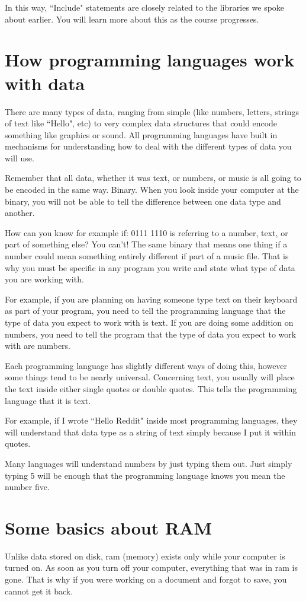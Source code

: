 \documentclass[a4paper,12pt]{article}
\let\stdsection\section
\renewcommand\section{\newpage\stdsection}
\begin{document}
In this way, ``Include" statements are closely related to the libraries we spoke about earlier. You will learn more about this as the course progresses.
\section{How programming languages work with data}
There are many types of data, ranging from simple (like numbers, letters, strings of text like ``Hello", etc) to very complex data structures that could encode something like graphics or sound. All programming languages have built in mechanisms for understanding how to deal with the different types of data you will use.

Remember that all data, whether it was text, or numbers, or music is all going to be encoded in the same way. Binary. When you look inside your computer at the binary, you will not be able to tell the difference between one data type and another.

How can you know for example if: 0111 1110 is referring to a number, text, or part of something else? You can't! The same binary that means one thing if a number could mean something entirely different if part of a music file. That is why you must be specific in any program you write and state what type of data you are working with.

For example, if you are planning on having someone type text on their keyboard as part of your program, you need to tell the programming language that the type of data you expect to work with is text. If you are doing some addition on numbers, you need to tell the program that the type of data you expect to work with are numbers.

Each programming language has slightly different ways of doing this, however some things tend to be nearly universal. Concerning text, you usually will place the text inside either single quotes or double quotes. This tells the programming language that it is text.

For example, if I wrote ``Hello Reddit" inside most programming languages, they will understand that data type as a string of text simply because I put it within quotes.

Many languages will understand numbers by just typing them out. Just simply typing 5 will be enough that the programming language knows you mean the number five.
\section{Some basics about RAM}
Unlike data stored on disk, ram (memory) exists only while your computer is turned on. As soon as you turn off your computer, everything that was in ram is gone. That is why if you were working on a document and forgot to save, you cannot get it back.
\end{document}
